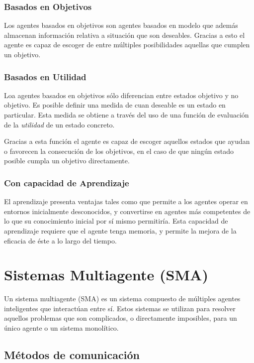 \subsubsection*{Basados en Objetivos}

Los agentes basados en objetivos son agentes basados en modelo que además
almacenan información relativa a situación que son deseables. Gracias a esto el
agente es capaz de escoger de entre múltiples posibilidades aquellas que
cumplen un objetivo.

\subsubsection*{Basados en Utilidad}

Loa agentes basados en objetivos sólo diferencian entre estados objetivo y no
objetivo. Es posible definir una medida de cuan deseable es un estado en
particular. Esta medida se obtiene a través del uso de una función de
evaluación de la {\em utilidad} de un estado concreto.

Gracias a esta función el agente es capaz de escoger aquellos estados que
ayudan o favorecen la consecución de los objetivos, en el caso de que ningún
estado posible cumpla un objetivo directamente.

\subsubsection*{Con capacidad de Aprendizaje}

El aprendizaje presenta ventajas tales como que permite a los agentes operar en
entornos inicialmente desconocidos, y convertirse en agentes más competentes
de lo que su conocimiento inicial por sí mismo permitiría. Esta capacidad de
aprendizaje requiere que el agente tenga memoria, y permite la mejora de la
eficacia de éste a lo largo del tiempo.

\section*{Sistemas Multiagente (SMA)}


Un sistema multiagente (SMA) es un sistema compuesto de múltiples agentes
inteligentes que interactúan entre sí. Estos sistemas se utilizan para resolver
aquellos problemas que son complicados, o directamente imposibles, para un único
agente o un sistema monolítico.

\subsection*{Métodos de comunicación}
